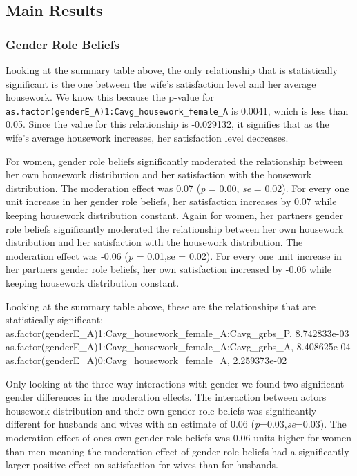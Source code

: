 \documentclass[
  english,
  man,floatsintext]{apa6}
\begin{document}
\hypertarget{main-results}{%
\subsection{Main Results}\label{main-results}}

\hypertarget{gender-role-beliefs}{%
\subsubsection{Gender Role Beliefs}\label{gender-role-beliefs}}

Looking at the summary table above, the only relationship that is statistically significant is the one between the wife's satisfaction level and her average housework. We know this because the p-value for \texttt{as.factor(genderE\_A)1:Cavg\_housework\_female\_A} is 0.0041, which is less than 0.05. Since the value for this relationship is -0.029132, it signifies that as the wife's average housework increases, her satisfaction level decreases.

For women, gender role beliefs significantly moderated the relationship between her own housework distribution and her satisfaction with the housework distribution. The moderation effect was 0.07 (\emph{p} = 0.00, \emph{se} = 0.02). For every one unit increase in her gender role beliefs, her satisfaction increases by 0.07 while keeping housework distribution constant. Again for women, her partners gender role beliefs significantly moderated the relationship between her own housework distribution and her satisfaction with the housework distribution. The moderation effect was -0.06 (\emph{p} = 0.01,se = 0.02). For every one unit increase in her partners gender role beliefs, her own satisfaction increased by -0.06 while keeping housework distribution constant.

Looking at the summary table above, these are the relationships that are statistically significant:
as.factor(genderE\_A)1:Cavg\_housework\_female\_A:Cavg\_grbs\_P, 8.742833e-03
as.factor(genderE\_A)1:Cavg\_housework\_female\_A:Cavg\_grbs\_A, 8.408625e-04
as.factor(genderE\_A)0:Cavg\_housework\_female\_A, 2.259373e-02

Only looking at the three way interactions with gender we found two significant gender differences in the moderation effects. The interaction between actors housework distribution and their own gender role beliefs was significantly different for husbands and wives with an estimate of 0.06 (\emph{p}=0.03,\emph{se}=0.03). The moderation effect of ones own gender role beliefs was 0.06 units higher for women than men meaning the moderation effect of gender role beliefs had a significantly larger positive effect on satisfaction for wives than for husbands.
\end{document}
